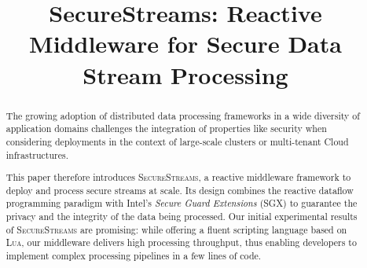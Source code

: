 \documentclass{sig-alternate}
\newcommand{\SYS}{\textsc{SecureStreams}\xspace}
\begin{document}
\title{SecureStreams: Reactive Middleware for Secure Data Stream Processing}
\date{}

\author{
}

\maketitle


\begin{abstract}
The growing adoption of distributed data processing frameworks in a wide diversity of application domains challenges the integration of properties like security when considering deployments in the context of large-scale clusters or multi-tenant Cloud infrastructures.

This paper therefore introduces \SYS{}, a reactive middleware framework to deploy and process secure streams at scale.
Its design combines the reactive dataflow programming paradigm with Intel's \emph{Secure Guard Extensions} (SGX) to guarantee the privacy and the integrity of the data being processed.
Our initial experimental results of \SYS{} are promising: while offering a fluent scripting language based on \textsc{Lua}, our middleware delivers high processing throughput, thus enabling developers to implement complex processing pipelines in a few lines of code.
\end{abstract}




















%
{
\footnotesize


}
\end{document}
